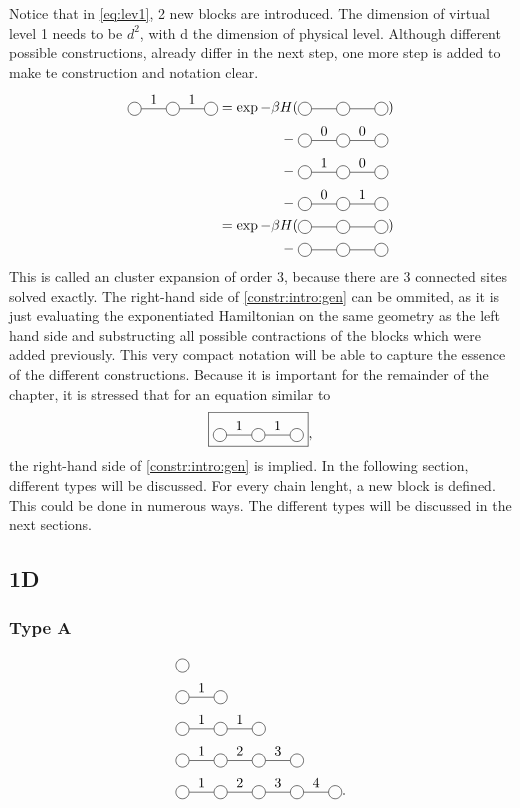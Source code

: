 \documentclass[twocolumn]{article}
\newcounter{a}
\newcounter{b}
\begin{document}
Notice that in \cref{eq:lev1}, 2 new blocks are introduced. The dimension of virtual level 1 needs to be $d^2$, with d the dimension of physical level. Although different possible constructions, already differ in the next step, one more step is added to make te construction and notation clear.
\begin{equation}\label{constr:intro:gen}
    \begin{split}
        \mpob{3}{ {0,1,1,0}  }{}{}{}{{,,,}}  = \exp  -\beta H( &\mpob{3}{ {,,,} }{}{}{}{{,,}})  \\
        - \;&\mpob{3}{ {0,0,0,0}  }{}{}{}{{,,,}}\\
        - \; &\mpob{3}{ {0,1,0,0}  }{}{}{}{{,,,}}\\
        - \; &\mpob{3}{ {0,0,1,0}  }{}{}{}{{,,,}}\\
        =\exp  -\beta H( &\mpob{3}{ {,,,} }{}{}{}{{,,}})\\
        - \; &\mpob{3}{ {,,,}  }{}{}{}{{,,,}}\\
    \end{split}
\end{equation}
This is called an cluster expansion of order 3, because there are 3 connected sites solved exactly. The right-hand side of \cref{constr:intro:gen} can be ommited, as it is just evaluating the exponentiated Hamiltonian on the same geometry as the left hand side and substructing all possible contractions of the blocks which were added previously. This very compact notation will be able to capture the essence of the different constructions. Because it is important for the remainder of the chapter, it is stressed that for an equation similar to
\begin{equation}
    \boxed{\mpob{3}{ {0,1,1,0}  }{}{}{}{{,,,}} },
\end{equation}
the right-hand side of \cref{constr:intro:gen} is implied. In the following section, different types will be discussed. For every chain lenght, a new block is defined. This could be done in numerous ways. The different types will be discussed in the next sections.

\subsection{1D}
\subsubsection{Type A}
\begin{subequations}
    \begin{align}
         & \mpob{1}{ {,}  }{}{}{}{{,,}}                     \\
         & \mpob{2}{ {,"1",}  }{}{}{}{{,,}}                 \\
         & \mpob{3}{ {,"1","1",}  }{}{}{}{{,,,}}            \\
         & \mpob{4}{ {,"1","2","3",}  }{}{}{}{{,,,,,}}      \\
         & \mpob{5}{ {,"1","2","3","4",}  }{}{}{}{{,,,,,}}.
    \end{align}
\end{subequations}
\end{document}
